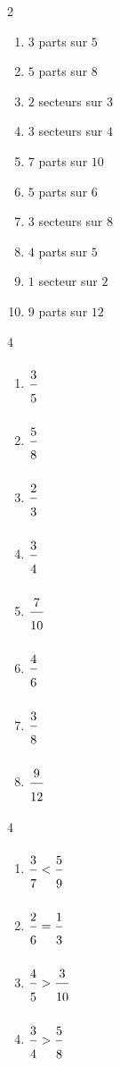 \ExoC
\begin{multicols}{2}
\begin{enumerate}[leftmargin=*,align=parleft, label=\alph*), itemsep=6pt, topsep=2pt]
\item $3$ parts sur $5$
\item $5$ parts sur $8$
\item $2$ secteurs sur $3$
\item $3$ secteurs sur $4$
\item $7$ parts sur $10$
\item $5$ parts sur $6$
\item $3$ secteurs sur $8$
\item $4$ parts sur $5$
\item $1$ secteur sur $2$
\item $9$ parts sur $12$
\end{enumerate}
\end{multicols}

\ExoC
\begin{multicols}{4}
\begin{enumerate}[leftmargin=*,align=parleft, label=\alph*), itemsep=6pt, topsep=2pt]
\item $\FA{3}{5}$
\item $\FA{5}{8}$
\item $\FA{2}{3}$
\item $\FA{3}{4}$
\item $\FA{7}{10}$
\item $\FA{4}{6}$
\item $\FA{3}{8}$
\item $\FA{9}{12}$
\end{enumerate}
\end{multicols}

\ExoC
\begin{multicols}{4}
\begin{enumerate}[leftmargin=*,align=parleft, label=\alph*), itemsep=6pt, topsep=2pt]
\item $\FA{3}{7}<\FA{5}{9}$
\item $\FA{2}{6}=\FA{1}{3}$
\item $\FA{4}{5}>\FA{3}{10}$
\item $\FA{3}{4}>\FA{5}{8}$
\end{enumerate}
\end{multicols}

